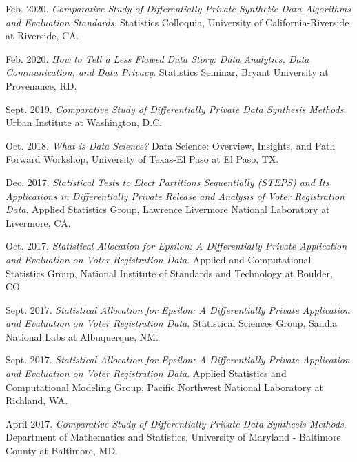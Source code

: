 \documentclass[11pt, letterpaper, roman]{moderncv} %
\begin{document}
\begin{etaremune}[topsep=0pt, itemsep=2pt, partopsep=0pt, parsep=0pt]
    \item Feb. 2020. \textit{Comparative Study of Differentially Private Synthetic Data Algorithms and Evaluation Standards}. Statistics Colloquia, University of California-Riverside at Riverside, CA.
    
    \item Feb. 2020. \textit{How to Tell a Less Flawed Data Story: Data Analytics, Data Communication, and Data Privacy}. Statistics Seminar, Bryant University at Provenance, RD.
    
    \item Sept. 2019. \textit{Comparative Study of Differentially Private Data Synthesis Methods}. Urban Institute at Washington, D.C.
    
    \item Oct. 2018. \textit{What is Data Science?} Data Science: Overview, Insights, and Path Forward Workshop, University of Texas-El Paso at El Paso, TX.
    
    \item Dec. 2017. \textit{Statistical Tests to Elect Partitions Sequentially (STEPS) and Its Applications in Differentially Private Release and Analysis of Voter Registration Data}. Applied Statistics Group, Lawrence Livermore National Laboratory at Livermore, CA.
    
    \item Oct. 2017. \textit{Statistical Allocation for Epsilon: A Differentially Private Application and Evaluation on Voter Registration Data}. Applied and Computational Statistics Group, National Institute of Standards and Technology at Boulder, CO.
    
    \item Sept. 2017. \textit{Statistical Allocation for Epsilon: A Differentially Private Application and Evaluation on Voter Registration Data}. Statistical Sciences Group, Sandia National Labs at Albuquerque, NM.
    
    \item Sept. 2017. \textit{Statistical Allocation for Epsilon: A Differentially Private Application and Evaluation on Voter Registration Data}. Applied Statistics and Computational Modeling Group, Pacific Northwest National Laboratory at Richland, WA.
    
    \item April 2017. \textit{Comparative Study of Differentially Private Data Synthesis Methods}. Department of Mathematics and Statistics, University of Maryland - Baltimore County at Baltimore, MD.
    

\end{etaremune}
\end{document}
